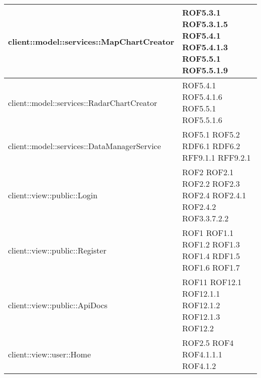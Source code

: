 \begin{center}
\begin{longtable}{| p{11cm} | p{2.5cm} |}
\hline
client::model::services::MapChartCreator & ROF5.3.1 \newline ROF5.3.1.5 \newline ROF5.4.1 \newline ROF5.4.1.3 \newline ROF5.5.1 \newline ROF5.5.1.9 \\
\hline
client::model::services::RadarChartCreator & ROF5.4.1 \newline ROF5.4.1.6 \newline ROF5.5.1 \newline ROF5.5.1.6 \\
\hline
client::model::services::DataManagerService & ROF5.1 \newline ROF5.2 \newline RDF6.1 \newline RDF6.2 \newline RFF9.1.1 \newline RFF9.2.1 \\
\hline
client::view::public::Login & ROF2 \newline ROF2.1 \newline ROF2.2 \newline ROF2.3 \newline ROF2.4 \newline ROF2.4.1 \newline ROF2.4.2 \newline ROF3.3.7.2.2 \\
\hline
client::view::public::Register & ROF1 \newline ROF1.1 \newline ROF1.2 \newline ROF1.3 \newline ROF1.4 \newline RDF1.5 \newline ROF1.6 \newline ROF1.7 \\
\hline
client::view::public::ApiDocs & ROF11 \newline ROF12.1 \newline ROF12.1.1 \newline ROF12.1.2 \newline ROF12.1.3 \newline ROF12.2 \\
\hline
client::view::user::Home & ROF2.5 \newline ROF4 \newline ROF4.1.1.1 \newline ROF4.1.2 \\

\end{longtable}
\end{center}
